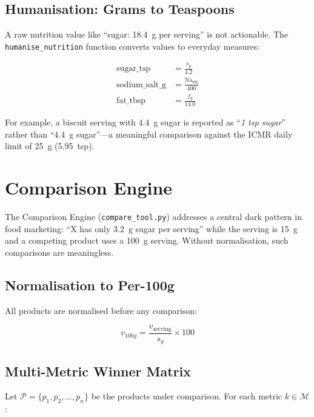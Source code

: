 \documentclass[conference]{IEEEtran}
\begin{document}
\subsection{Humanisation: Grams to Teaspoons}

A raw nutrition value like ``sugar: 18.4~g per serving'' is not actionable.
The \texttt{humanise\_nutrition} function converts values to everyday measures:

\begin{align}
\text{sugar\_tsp} &= \frac{s_g}{4.2} \label{eq:tsp} \\
\text{sodium\_salt\_g} &= \frac{\text{Na}_\text{mg}}{400} \label{eq:salt} \\
\text{fat\_tbsp} &= \frac{f_g}{14.0} \label{eq:fat}
\end{align}

For example, a biscuit serving with 4.4~g sugar is reported as
``\textit{1 tsp sugar}'' rather than ``4.4~g sugar''---a meaningful
comparison against the ICMR daily limit of 25~g (5.95~tsp).

\section{Comparison Engine}

The Comparison Engine (\texttt{compare\_tool.py}) addresses a central dark pattern
in food marketing: ``X has only 3.2~g sugar per serving'' while the serving is 15~g
and a competing product uses a 100~g serving. Without normalisation, such
comparisons are meaningless.

\subsection{Normalisation to Per-100g}

All products are normalised before any comparison:

\begin{equation}
v_{100g} = \frac{v_{\text{serving}}}{s_g} \times 100
\label{eq:norm}
\end{equation}

\subsection{Multi-Metric Winner Matrix}

Let $\mathcal{P} = \{p_1, p_2, \ldots, p_n\}$ be the products under comparison.
For each metric $k \in \mathcal{M}$:
\end{document}
